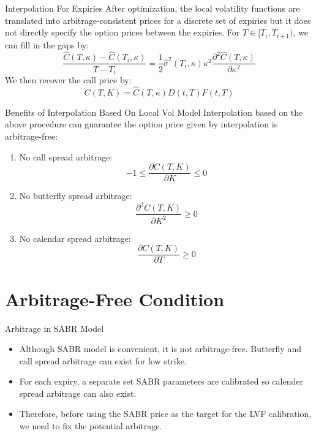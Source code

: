 \documentclass[10pt,table,mathserif]{beamer}
\begin{document}
\begin{frame}{Interpolation For Expiries}
After optimization,  the local volatility functions are translated into arbitrage-consistent prices for a discrete set of expiries but it does not directly specify the option prices between the expiries.  For $T \in [T_i,T_{i+1})$, we can fill in the gaps by:
\[
\frac{\widehat{C}(T,\kappa) -\widehat{C}(T_{i},\kappa)}{T-T_{i}}=\frac{1}{2}\widehat{\sigma}^2(T_i,\kappa) \kappa^2 \frac{\partial^2 \widehat{C}(T,\kappa) }  {\partial \kappa^2}
\]
We then recover the call price by:
\[
C(T,K)=\widehat{C}(T,\kappa){D(t,T)F(t,T)}
\]
\end{frame}


\begin{frame}{Benefits of Interpolation Based On Local Vol Model}
Interpolation based on the above procedure can guarantee the option price given by interpolation is arbitrage-free:
\begin{enumerate}
	\item No call spread arbitrage:
	\[
	-1 \leq \frac{\partial C(T,K)}{ \partial K} \leq 0
	\]
	\item  No butterfly spread arbitrage:
	\[
	\frac{\partial^2 C(T,K)}{ \partial K^2} \geq 0
	\]
	\item  No calendar spread arbitrage:
	\[
	\frac{\partial C(T,K)}{ \partial T} \geq 0
	\]
\end{enumerate}
\end{frame}

\section{Arbitrage-Free Condition}
\begin{frame}{Arbitrage in SABR Model}
\begin{itemize}
	\item Although SABR model is convenient, it is not arbitrage-free. Butterfly and call spread arbitrage can exist for low strike.
	\item For each expiry, a separate set SABR parameters are calibrated so calender spread arbitrage can also exist.
	\item Therefore, before using the SABR price as the target for the LVF calibration, we need to fix the potential arbitrage.
\end{itemize}
\end{frame}
\end{document}
